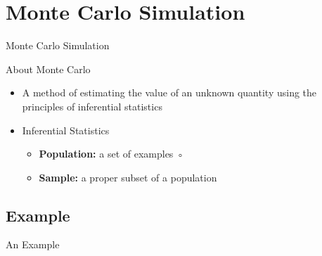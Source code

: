 \documentclass{beamer}
\begin{document}
    \section{Monte Carlo Simulation}
    \begin{frame}{Monte Carlo Simulation}
        \begin{block}{About Monte Carlo}
            \begin{itemize}
                \item A method of estimating the value of an unknown quantity using the principles of inferential statistics
                \item Inferential Statistics
                \begin{itemize}
                    \item[] \textbf{Population:} a set of examples
    ◦               \item[] \textbf{Sample:} a proper subset of a population 
                \end{itemize}
            \end{itemize}
            \vspace{1em}
        \end{block}
        \vspace{1em}
    \end{frame}

    \subsection{Example}
    \begin{frame}{An Example}
        \begin{center}
        \end{center}
    \end{frame}
    
\end{document}
